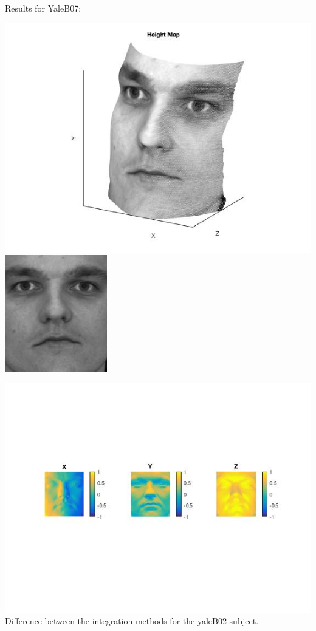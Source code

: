\documentclass[fleqn]{article}
\begin{document}
\newpage

Results for YaleB07:
 
\vspace{10 mm}
\includegraphics{yaleB07.jpg}
\newpage
\includegraphics{yaleB07_albedo.jpg}

\includegraphics{a7.jpg}
\newpage
Difference between the integration methods for the yaleB02 subject.
\vspace{10 mm}
\end{document}
